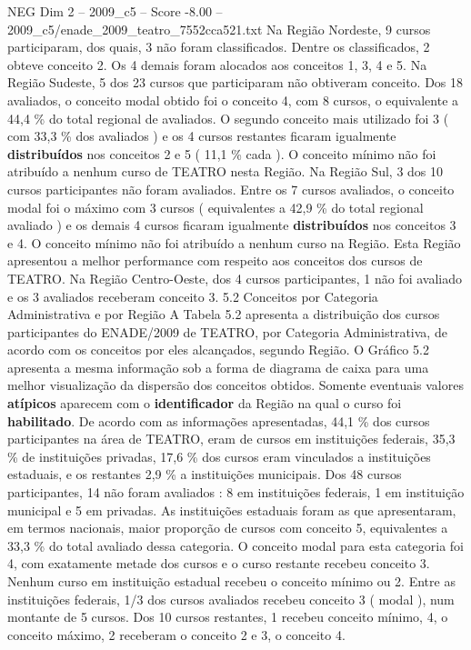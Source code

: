 \begin{textsample}{NEG Dim 2 – 2009\_c5 – Score -8.00 – 2009\_c5/enade\_2009\_teatro\_7552cca521.txt}
Na Região Nordeste, 9 cursos participaram, dos quais, 3 não foram classificados.
Dentre os classificados, 2 obteve conceito 2.
Os 4 demais foram alocados aos conceitos 1, 3, 4 e 5.
Na Região Sudeste, 5 dos 23 cursos que participaram não obtiveram conceito.
Dos 18 avaliados, o conceito modal obtido foi o conceito 4, com 8 cursos, o equivalente a 44,4 \% do total regional de avaliados.
O segundo conceito mais utilizado foi 3 ( com 33,3 \% dos avaliados ) e os 4 cursos restantes ficaram igualmente \textbf{distribuídos} nos conceitos 2 e 5 ( 11,1 \% cada ).
O conceito mínimo não foi atribuído a nenhum curso de TEATRO nesta Região.
Na Região Sul, 3 dos 10 cursos participantes não foram avaliados.
Entre os 7 cursos avaliados, o conceito modal foi o máximo com 3 cursos ( equivalentes a 42,9 \% do total regional avaliado ) e os demais 4 cursos ficaram igualmente \textbf{distribuídos} nos conceitos 3 e 4.
O conceito mínimo não foi atribuído a nenhum curso na Região.
Esta Região apresentou a melhor performance com respeito aos conceitos dos cursos de TEATRO.
Na Região Centro-Oeste, dos 4 cursos participantes, 1 não foi avaliado e os 3 avaliados receberam conceito 3. 5.2 Conceitos por Categoria Administrativa e por Região A Tabela 5.2 apresenta a distribuição dos cursos participantes do ENADE/2009 de TEATRO, por Categoria Administrativa, de acordo com os conceitos por eles alcançados, segundo Região.
O Gráfico 5.2 apresenta a mesma informação sob a forma de diagrama de caixa para uma melhor visualização da dispersão dos conceitos obtidos.
Somente eventuais valores \textbf{atípicos} aparecem com o \textbf{identificador} da Região na qual o curso foi \textbf{habilitado}.
De acordo com as informações apresentadas, 44,1 \% dos cursos participantes na área de TEATRO, eram de cursos em instituições federais, 35,3 \% de instituições privadas, 17,6 \% dos cursos eram vinculados a instituições estaduais, e os restantes 2,9 \% a instituições municipais.
Dos 48 cursos participantes, 14 não foram avaliados : 8 em instituições federais, 1 em instituição municipal e 5 em privadas.
As instituições estaduais foram as que apresentaram, em termos nacionais, maior proporção de cursos com conceito 5, equivalentes a 33,3 \% do total avaliado dessa categoria.
O conceito modal para esta categoria foi 4, com exatamente metade dos cursos e o curso restante recebeu conceito 3.
Nenhum curso em instituição estadual recebeu o conceito mínimo ou 2.
Entre as instituições federais, 1/3 dos cursos avaliados recebeu conceito 3 ( modal ), num montante de 5 cursos.
Dos 10 cursos restantes, 1 recebeu conceito mínimo, 4, o conceito máximo, 2 receberam o conceito 2 e 3, o conceito 4.

\end{textsample}

